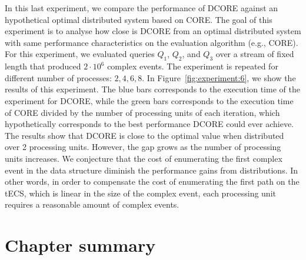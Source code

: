 In this last experiment, we compare the performance of DCORE against an hypothetical optimal distributed system based on CORE. The goal of this experiment is to analyse how close is DCORE from an optimal distributed system with same performance characteristics on the evaluation algorithm (e.g., CORE). For this experiment, we evaluated queries $Q_{1}$, $Q_{2}$, and $Q_{3}$ over a stream of fixed length that produced $2 \cdot 10^{6}$ complex events. The experiment is repeated for different number of processes: $2, 4, 6, 8$. In Figure~\ref{fig:experiment:6}, we show the results of this experiment. The blue bars corresponds to the execution time of the experiment for DCORE, while the green bars corresponds to the execution time of CORE divided by the number of processing units of each iteration, which hypothetically corresponds to the best performance DCORE could ever achieve. The results show that DCORE is close to the optimal value when distributed over 2 processing units. However, the gap grows as the number of processing units increases. We conjecture that the cost of enumerating the first complex event in the data structure diminish the performance gains from distributions. In other words, in order to compensate the cost of enumerating the first path on the tECS, which is linear in the size of the complex event, each processing unit requires a reasonable amount of complex events.

\section{Chapter summary}
